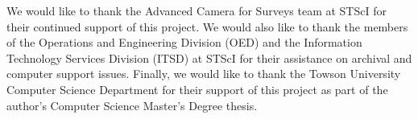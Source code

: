 \documentclass[11pt,twoside]{article}
\begin{document}

\acknowledgements We would like to thank the Advanced Camera for Surveys team at STScI for their continued support of this project. We would also like to thank the members of the Operations and Engineering Division (OED) and the Information Technology Services Division (ITSD) at STScI for their assistance on archival and computer support issues.  Finally,  we would like to thank the Towson University Computer Science Department for their support of this project as part of the author's Computer Science Master's Degree thesis.


\end{document}
